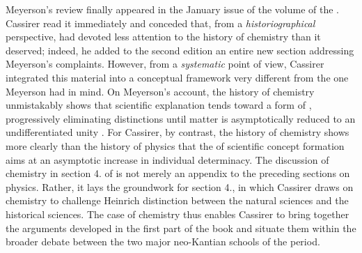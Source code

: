 \documentclass[submitted,12pt]{article}
\begin{document}

Meyerson's review finally appeared in the January issue of the \citeyear{Meyerson1911} volume of the . Cassirer read it immediately and conceded that, from a \emph{historiographical} perspective, \EPt had devoted less attention to the history of chemistry than it deserved; indeed, he added to the second edition an entire new section addressing Meyerson's complaints. However, from a \emph{systematic} point of view, Cassirer integrated this material into a conceptual framework very different from the one Meyerson had in mind. On Meyerson’s account, the history of chemistry unmistakably shows that scientific explanation tends toward a form of  \citep[129]{Meyerson1911}, progressively eliminating distinctions until matter is asymptotically reduced to an undifferentiated unity \citep[see][ch.~]{Meyerson1908}. For Cassirer, by contrast, the history of chemistry shows more clearly than the history of physics that the  of scientific concept formation aims at an asymptotic increase in individual determinacy. The discussion of chemistry in section 4. of \SFt is not merely an appendix to the preceding sections on physics. Rather, it lays the groundwork for section 4., in which Cassirer draws on chemistry to challenge Heinrich  distinction between the  natural sciences and the  historical sciences. The case of chemistry thus enables Cassirer to bring together the arguments developed in the first part of the book and situate them within the broader debate between the two major neo-Kantian schools of the period.
\end{document}
